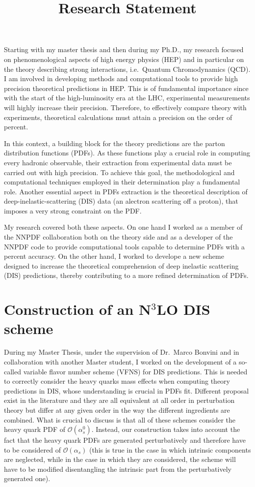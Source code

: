\documentclass[11pt,a4paper]{moderncv}        %
\title{Research Statement}
\begin{document}
\makecvtitle

Starting with my master thesis and then during my Ph.D., my research focused on phenomenological aspects of high energy physics (HEP)
and in particular on the theory describing strong interactions, i.e.\ Quantum Chromodynamics (QCD).
I am involved in developing methods and computational tools to provide high precision theoretical predictions in HEP.
This is of fundamental importance since with the start of the high-luminosity era at the LHC, experimental measurements will highly 
increase their precision.
Therefore, to effectively compare theory with experiments, theoretical calculations must attain a precision on the order of percent.

In this context, a building block for the theory predictions are the parton distribution functions (PDFs).
As these functions play a crucial role in computing every hadronic observable, their extraction from
experimental data must be carried out with high precision.
To achieve this goal, the methodological and computational techniques employed in their determination play a fundamental role. 
Another essential aspect in PDFs extraction is the theoretical description of deep-inelastic-scattering (DIS) data (an alectron scattering off
a proton), that imposes a very strong constraint on the PDF.

My research covered both these aspects.
On one hand I worked as a member of the NNPDF collaboration both on the theory side and as a developer of the NNPDF code to provide
computational tools capable to determine PDFs with a percent accuracy.
On the other hand, I worked to develope a new scheme designed to increase the theoretical comprehension of deep inelastic scattering
(DIS) predictions, thereby contributing to a more refined determination of PDFs.

\section{Construction of an N$^3$LO DIS scheme}

During my Master Thesis, under the supervision of Dr.\ Marco Bonvini and in collaboration with another Master student,
I worked on the development of a so-called variable flavor number scheme (VFNS) for DIS predictions.
This is needed to correctly consider the heavy quarks mass effects when computing theory predictions in DIS,
whose understanding is crucial in PDFs fit.
Different proposal exist in the literature and they are all equivalent at all order in perturbation theory but differ at any given
order in the way the different ingredients are combined.
What is crucial to discuss is that all of these schemes consider the heavy quark PDF of $\mathcal{O}(\alpha_s^0)$.
Instead, our construction takes into account the fact that the heavy quark PDFs are generated
perturbatively and therefore have to be considered of $\mathcal{O}(\alpha_s)$ (this is true in the case in which intrinsic components
are neglected, while in the case in which they are considered, the scheme will
have to be modified disentangling the intrinsic part from the perturbatively generated one).
\end{document}
